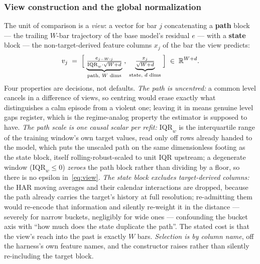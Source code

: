 \subsubsection{View construction and the global normalization}

The unit of comparison is a \emph{view}: a vector for bar $j$ concatenating a
\textbf{path} block --- the trailing $W$-bar trajectory of the base model's
residual $e$ --- with a \textbf{state} block --- the non-target-derived feature
columns $x_j$ of the bar the view predicts:
\begin{equation}
v_j \;=\; \Bigl[\;
\underbrace{\tfrac{e_{j-W:j}}{\mathrm{IQR}_w \cdot \sqrt{W+d}}}_{\text{path, } W \text{ dims}}
\;,\;
\underbrace{\tfrac{x_j}{\sqrt{W+d}}}_{\text{state, } d \text{ dims}}
\;\Bigr] \;\in\; \mathbb{R}^{W+d}.
\label{eq:view}
\end{equation}
Four properties are decisions, not defaults. \emph{The path is uncentred:} a common
level cancels in a difference of views, so centring would erase exactly what
distinguishes a calm episode from a violent one; leaving it in means genuine level
gaps register, which is the regime-analog property the estimator is supposed to
have. \emph{The path scale is one causal scalar per refit:} $\mathrm{IQR}_w$ is the
interquartile range of the training window's own target values, read only off rows
already handed to the model, which puts the unscaled path on the same dimensionless
footing as the state block, itself rolling-robust-scaled to unit IQR upstream; a
degenerate window ($\mathrm{IQR}_w \le 0$) \emph{zeroes} the path block rather than
dividing by a floor, so there is no epsilon in~\eqref{eq:view}. \emph{The state
block excludes target-derived columns:} the HAR moving averages and their calendar
interactions are dropped, because the path already carries the target's history at
full resolution; re-admitting them would re-encode that information and silently
re-weight it in the distance --- severely for narrow buckets, negligibly for wide
ones --- confounding the bucket axis with ``how much does the state duplicate the
path''. The stated cost is that the view's reach into the past is exactly $W$ bars.
\emph{Selection is by column name}, off the harness's own feature names, and the
constructor raises rather than silently re-including the target block.

